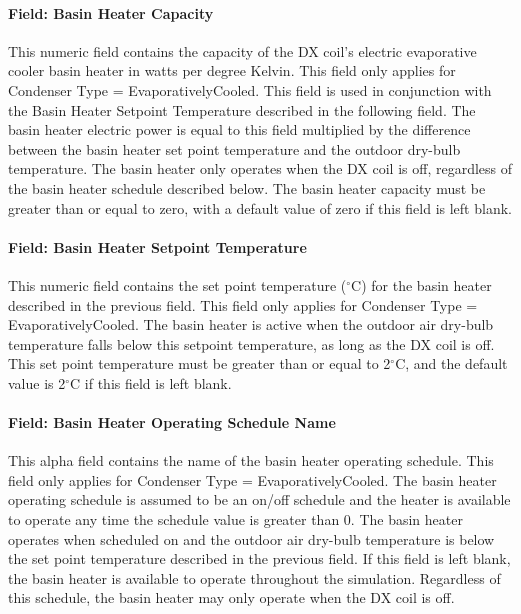 \paragraph{Field: Basin Heater Capacity}\label{field-basin-heater-capacity-2-000}

This numeric field contains the capacity of the DX coil's electric evaporative cooler basin heater in watts per degree Kelvin. This field only applies for Condenser Type = EvaporativelyCooled. This field is used in conjunction with the Basin Heater Setpoint Temperature described in the following field. The basin heater electric power is equal to this field multiplied by the difference between the basin heater set point temperature and the outdoor dry-bulb temperature. The basin heater only operates when the DX coil is off, regardless of the basin heater schedule described below. The basin heater capacity must be greater than or equal to zero, with a default value of zero if this field is left blank.

\paragraph{Field: Basin Heater Setpoint Temperature}\label{field-basin-heater-setpoint-temperature-2-000}

This numeric field contains the set point temperature ($^\circ$C) for the basin heater described in the previous field. This field only applies for Condenser Type = EvaporativelyCooled. The basin heater is active when the outdoor air dry-bulb temperature falls below this setpoint temperature, as long as the DX coil is off. This set point temperature must be greater than or equal to 2$^\circ$C, and the default value is 2$^\circ$C if this field is left blank.

\paragraph{Field: Basin Heater Operating Schedule Name}\label{field-basin-heater-operating-schedule-name-2-000}

This alpha field contains the name of the basin heater operating schedule. This field only applies for Condenser Type = EvaporativelyCooled. The basin heater operating schedule is assumed to be an on/off schedule and the heater is available to operate any time the schedule value is greater than 0. The basin heater operates when scheduled on and the outdoor air dry-bulb temperature is below the set point temperature described in the previous field. If this field is left blank, the basin heater is available to operate throughout the simulation. Regardless of this schedule, the basin heater may only operate when the DX coil is off.

